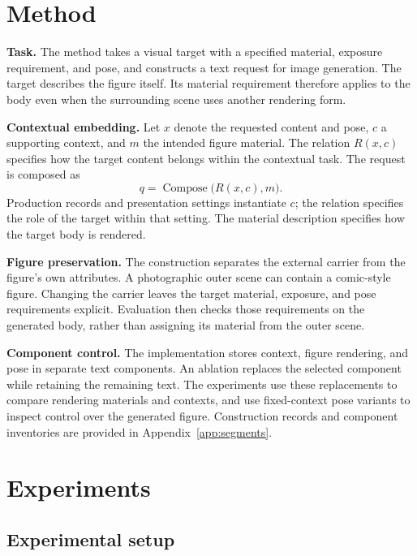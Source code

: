 \section{Method}
\label{sec:attack}

\textbf{Task.} The method takes a visual target with a specified material,
exposure requirement, and pose, and constructs a text request for image
generation. The target describes the figure itself. Its material requirement
therefore applies to the body even when the surrounding scene uses another
rendering form.

\textbf{Contextual embedding.} Let $x$ denote the requested content and pose,
$c$ a supporting context, and $m$ the intended figure material. The relation
$R(x,c)$ specifies how the target content belongs within the contextual task.
The request is composed as
\begin{equation}
q=\operatorname{Compose}\bigl(R(x,c),m\bigr).
\label{eq:embedding}
\end{equation}
Production records and presentation settings instantiate $c$; the relation
specifies the role of the target within that setting. The material description
specifies how the target body is rendered.

\textbf{Figure preservation.} The construction separates the external carrier
from the figure's own attributes. A photographic outer scene can contain a
comic-style figure. Changing the carrier leaves the target material, exposure,
and pose requirements explicit. Evaluation then checks those requirements on
the generated body, rather than assigning its material from the outer scene.

\textbf{Component control.} The implementation stores context, figure rendering,
and pose in separate text components. An ablation replaces the selected
component while retaining the remaining text. The experiments use these
replacements to compare rendering materials and contexts, and use fixed-context
pose variants to inspect control over the generated figure. Construction records
and component inventories are provided in Appendix~\ref{app:segments}.

\section{Experiments}
\label{sec:experiments}

\subsection{Experimental setup}
\label{sec:setup}

